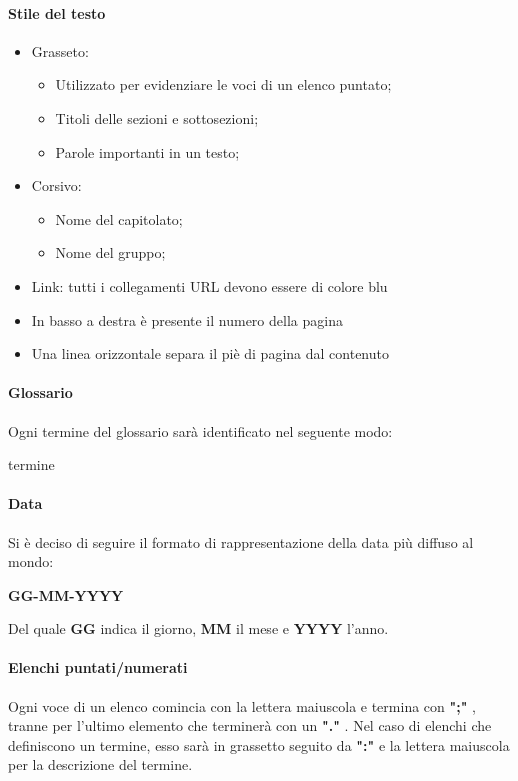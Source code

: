 \paragraph{Stile del testo}
\begin{itemize}
\item Grasseto:
\begin{itemize}
\item Utilizzato per evidenziare le voci di un elenco puntato;
\item Titoli delle sezioni e sottosezioni;
\item Parole importanti in un testo;
\end{itemize}
\item Corsivo:
\begin{itemize}
\item Nome del capitolato;
\item Nome del gruppo;
\end{itemize}
\item Link: tutti i collegamenti URL devono essere di colore blu
\item In basso a destra è presente il numero della pagina
\item Una linea orizzontale separa il piè di pagina dal contenuto

\end{itemize}

\paragraph*{Glossario}
Ogni termine del glossario sarà identificato nel seguente modo:
\begin{center}
termine
\end{center}

\paragraph*{Data}

Si è deciso di seguire il formato di rappresentazione della data più diffuso al mondo:\\
\begin{center}
\textbf{GG-MM-YYYY}
\end{center}
Del quale \textbf{GG} indica il giorno, \textbf{MM} il mese e \textbf{YYYY} l'anno.

\paragraph*{Elenchi puntati/numerati}
Ogni voce di un elenco comincia con la lettera maiuscola e termina con \textbf{";"} , tranne per l'ultimo elemento che terminerà con un \textbf{"."} . 
Nel caso di elenchi che definiscono un termine, esso sarà in grassetto seguito da \textbf{":"} e la lettera maiuscola per la descrizione del termine.

